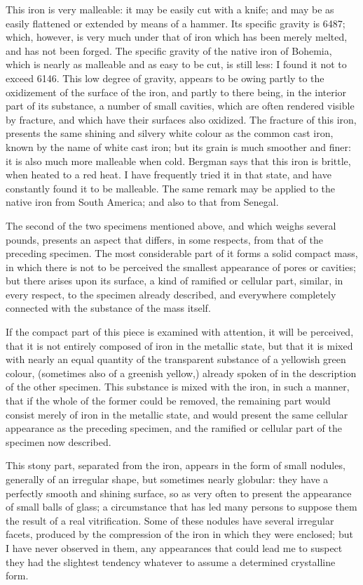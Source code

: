 \documentclass[a4paper, 12pt, oneside]{article}
\begin{document}
This iron is very malleable: it may be easily cut with a knife; and may be as easily flattened or extended by means of a hammer. Its specific gravity is 6487; which, however, is very much under that of iron which has been merely melted, and has not been forged. The specific gravity of the native iron of Bohemia, which is nearly as malleable and as easy to be cut, is still less: I found it not to exceed 6146. This low degree of gravity, appears to be owing partly to the oxidizement of the surface of the iron, and partly to there being, in the interior part of its substance, a number of small cavities, which are often rendered visible by fracture, and which have their surfaces also oxidized. The fracture of this iron, presents the same shining and silvery white colour as the common cast iron, known by the name of white cast iron; but its grain is much smoother and finer: it is also much more malleable when cold. Bergman says that this iron is brittle, when heated to a red heat. I have frequently tried it in that state, and have constantly found it to be malleable. The same remark may be applied to the native iron from South America; and also to that from Senegal.

The second of the two specimens mentioned above, and which weighs several pounds, presents an aspect that differs, in some respects, from that of the preceding specimen. The most considerable part of it forms a solid compact mass, in which there is not to be perceived the smallest appearance of pores or cavities; but there arises upon its surface, a kind of ramified or cellular part, similar, in every respect, to the specimen already described, and everywhere completely connected with the substance of the mass itself.

If the compact part of this piece is examined with attention, it will be perceived, that it is not entirely composed of iron in the metallic state, but that it is mixed with nearly an equal quantity of the transparent substance of a yellowish green colour, (sometimes also of a greenish yellow,) already spoken of in the description of the other specimen. This substance is mixed with the iron, in such a manner, that if the whole of the former could be removed, the remaining part would consist merely of iron in the metallic state, and would present the same cellular appearance as the preceding specimen, and the ramified or cellular part of the specimen now described.

This stony part, separated from the iron, appears in the form of small nodules, generally of an irregular shape, but sometimes nearly globular: they have a perfectly smooth and shining surface, so as very often to present the appearance of small balls of glass; a circumstance that has led many persons to suppose them the result of a real vitrification. Some of these nodules have several irregular facets, produced by the compression of the iron in which they were enclosed; but I have never observed in them, any appearances that could lead me to suspect they had the slightest tendency whatever to assume a determined crystalline form.
\end{document}
